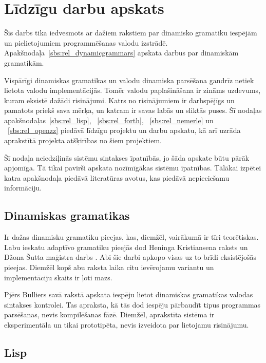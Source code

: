 \section{\label{s:related}Līdzīgu darbu apskats}

Šīs darbs tika iedvesmots ar dažiem rakstiem par dinamisko gramatiku iespējām un pielietojumiem programmēšanas valodu izstrādē. Apakšnodaļa~\ref{sbs:rel_dynamicgrammars} apskata darbus par dinamiskām gramatikām. 

Vispārīgi dinamiskas gramatikas un valodu dinamiska parsēšana gandrīz netiek lietota valodu implementācijās. Tomēr valodu paplašināšana ir zināms uzdevums, kuram eksistē dažādi risinājumi. Katrs no risinājumiem ir darbspējīgs un pamatots priekš sava mērķa, un katram ir savas labās un sliktās puses. Šī nodaļas apakšnodaļas~\ref{sbs:rel_lisp}, ~\ref{sbs:rel_forth}, ~\ref{sbs:rel_nemerle} un ~\ref{sbs:rel_openzz} piedāvā līdzīgu projektu un darbu apskatu, kā arī uzrāda aprakstītā projekta atšķirības no šiem projektiem.

Šī nodaļa neiedziļinās sistēmu sintakses īpatnībās, jo šāda apskate būtu pārāk apjomīga. Tā tikai pavirši apskata nozīmīgākas sistēmu īpatnības. Tālākai izpētei katra apakšnodaļa piedāvā literatūras avotus, kas piedāvā nepieciešamu informāciju.

\subsection{\label{sbs:rel_dynamicgrammars}Dinamiskas gramatikas}

Ir dažas dinamisku gramatiku pieejas, kas, diemžēl, vairākumā ir tīri teorētiskas. Labu ieskatu adaptīvo gramatiku pieejās dod Heninga Kristiansena raksts \cite{Christiansen:SurveyAdaptableGrammars} un Džona Šutta maģistra darbs \cite{Shutt:AdaptiveGrammars}. Abi šie darbi apkopo visas uz to brīdi eksistējošās pieejas. Diemžēl kopš abu raksta laika citu ievērojamu variantu un implementāciju skaits ir ļoti mazs.

Pjērs Bulliers savā rakstā \cite{Boullier:DynamicGrammars} apskata iespēju lietot dinamiskas gramatikas valodas sintakses kontrolei. Tas apraksta, kā tās dod iespēju pārbaudīt tipus programmas parsēšanas, nevis kompilēšanas fāzē. Diemžēl, aprakstīta sistēma ir eksperimentāla un tikai prototipēta, nevis izveidota par lietojamu risinājumu.


\subsection{\label{sbs:rel_lisp}Lisp}

